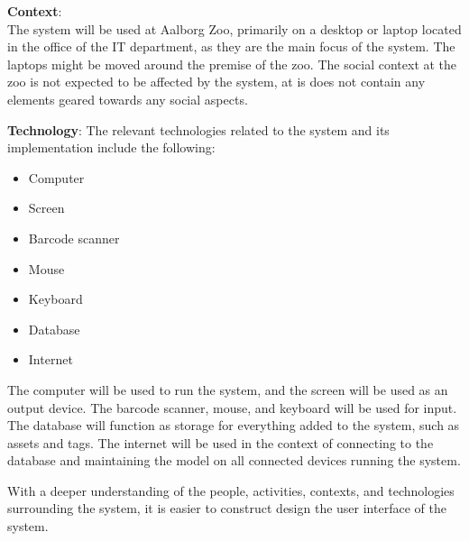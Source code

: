 \textbf{Context}: \\
The system will be used at Aalborg Zoo, primarily on a desktop or laptop located in the office of the IT department, as they are the main focus of the system. The laptops might be moved around the premise of the zoo. The social context at the zoo is not expected to be affected by the system, at is does not contain any elements geared towards any social aspects.
\par
 
\textbf{Technology}:
The relevant technologies related to the system and its implementation include the following:

\begin{itemize}
    \setlength\itemsep{0.05em}
    \item Computer
    \item Screen
    \item Barcode scanner
    \item Mouse
    \item Keyboard
    \item Database
    \item Internet
\end{itemize}

The computer will be used to run the system, and the screen will be used as an output device. The barcode scanner, mouse, and keyboard will be used for input. The database will function as storage for everything added to the system, such as assets and tags. The internet will be used in the context of connecting to the database and maintaining the model on all connected devices running the system.
\par
With a deeper understanding of the people, activities, contexts, and technologies surrounding the system, it is easier to construct design the user interface of the system.